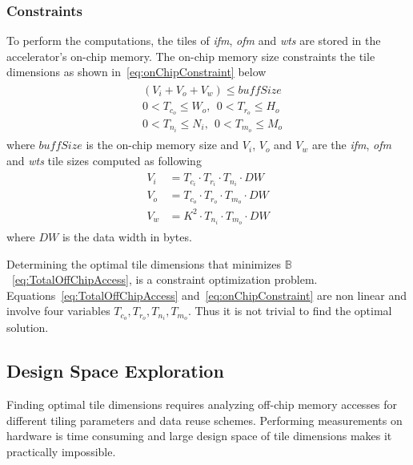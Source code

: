 \documentclass[a4paper,10pt]{article}
\newcommand{\numBytesOffChip}{\mathbb{B}}
\newcommand{\dataWidth}{DW}
\newcommand{\BuffSize}{buffSize}
\begin{document}
\subsubsection{Constraints}
To perform the computations, the tiles of \textit{ifm}, \textit{ofm} and \textit{wts} are stored in the accelerator's on-chip memory. The on-chip memory size constraints the tile dimensions as shown in~\eqref{eq:onChipConstraint} below
\begin{align}\label{eq:onChipConstraint}
	\begin{split}
		&(V_{i}{+}V_{o}{+}V_{w})\leq \BuffSize \\
		&0<T_{c_o}\leq W_o,~\ 0<T_{r_o}\leq H_o\\
		&0<T_{n_i}\leq N_i,~\ 0<T_{m_o}\leq M_o
	\end{split}
\end{align}
where $\BuffSize$ is the on-chip memory size and $V_{i}$, $V_{o}$ and $V_{w}$ are the \textit{ifm}, \textit{ofm} and \textit{wts} tile sizes computed as following 
\begin{align}\label{eq:tilesVol}
	\begin{split}
		V_{i}&=T_{c_i}{\cdot} T_{r_i}{\cdot} T_{n_i}{\cdot}\dataWidth\\
		V_{o}&=T_{c_o}{\cdot} T_{r_o}{\cdot} T_{m_o}{\cdot}\dataWidth\\
		V_{w}&=K^2{\cdot} T_{n_i}{\cdot} T_{m_o}{\cdot}\dataWidth
	\end{split}
\end{align}
where $\dataWidth$ is the data width in bytes. 

Determining the optimal tile dimensions that minimizes $\numBytesOffChip$~\eqref{eq:TotalOffChipAccess}, is a constraint optimization problem. Equations~\eqref{eq:TotalOffChipAccess} and~\eqref{eq:onChipConstraint} are non linear and involve four variables $T_{c_o},T_{r_o},T_{n_i},T_{m_o}$. Thus it is not trivial to find the optimal solution.
\subsection{Design Space Exploration}
Finding optimal tile dimensions requires analyzing off-chip memory accesses for different tiling parameters and data reuse schemes. Performing measurements on hardware is time consuming and large design space of tile dimensions makes it practically impossible. 
\end{document}
